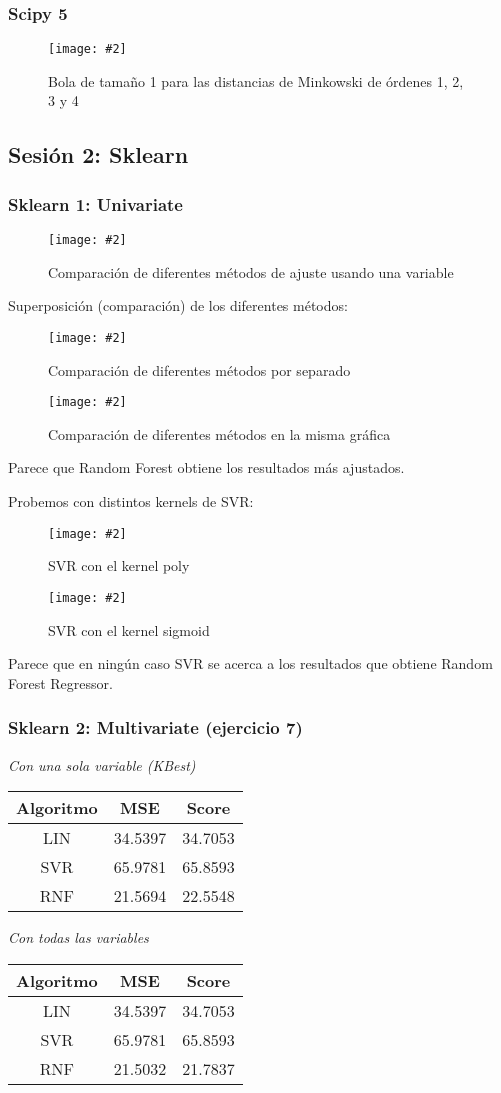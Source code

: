\documentclass[
12pt, 
spanish, 
singlespacing,
headsepline
]{article}
\newcommand{\image}[2]{
\begin{figure}[H]
	\caption{#1}
	\centering
	\texttt{[image: \#2]}
\end{figure}
}
\begin{document}
\subsubsection{Scipy 5}
\image{Bola de tamaño 1 para las distancias de Minkowski de órdenes 1, 2, 3 y 4}{pl1/Figure_6-Minkowski.png}

\subsection{Sesión 2: Sklearn}
\subsubsection{Sklearn 1: Univariate}

\image{Comparación de diferentes métodos de ajuste usando una variable}{pl1/Figure_3.png}

Superposición (comparación) de los diferentes métodos:
\image{Comparación de diferentes métodos por separado}{pl1/Figure_4-1.png}

\image{Comparación de diferentes métodos en la misma gráfica}{pl1/Figure_4-2.png}

Parece que Random Forest obtiene los resultados más ajustados.

Probemos con distintos kernels de SVR:

\image{SVR con el kernel poly}{pl1/Figure_5-poly.png}
\image{SVR con el kernel sigmoid}{pl1/Figure_5-sigmoid.png}

Parece que en ningún caso SVR se acerca a los resultados que obtiene Random Forest Regressor. 

\subsubsection{Sklearn 2: Multivariate (ejercicio 7)}
\begin{center}
\emph{Con una sola variable (KBest)}\\
\begin{tabular}{|c|c|c|}
\hline 
Algoritmo & MSE & Score \\ 
\hline 
LIN & 34.5397 & 34.7053 \\ 
\hline 
SVR & 65.9781 & 65.8593 \\ 
\hline 
RNF & 21.5694 & 22.5548 \\ 
\hline 
\end{tabular} 
\linebreak\linebreak\linebreak
\emph{Con todas las variables}\\
\begin{tabular}{|c|c|c|}
\hline 
Algoritmo & MSE & Score \\ 
\hline 
LIN & 34.5397 & 34.7053 \\ 
\hline 
SVR & 65.9781 & 65.8593 \\ 
\hline 
RNF & 21.5032 & 21.7837 \\ 
\hline 
\end{tabular} 
\end{center}
\end{document}
